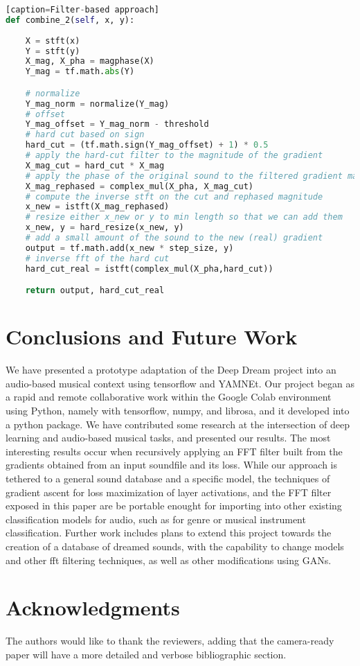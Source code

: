 \documentclass[a4paper,10pt,oneside]{article}
\begin{document}
\begin{sloppy}
\begin{lstlisting}[language=Python][caption=Filter-based approach]
def combine_2(self, x, y):
    
    X = stft(x)
    Y = stft(y)
    X_mag, X_pha = magphase(X)
    Y_mag = tf.math.abs(Y)

    # normalize
    Y_mag_norm = normalize(Y_mag)
    # offset
    Y_mag_offset = Y_mag_norm - threshold
    # hard cut based on sign
    hard_cut = (tf.math.sign(Y_mag_offset) + 1) * 0.5
    # apply the hard-cut filter to the magnitude of the gradient
    X_mag_cut = hard_cut * X_mag
    # apply the phase of the original sound to the filtered gradient mag
    X_mag_rephased = complex_mul(X_pha, X_mag_cut)
    # compute the inverse stft on the cut and rephased magnitude
    x_new = istft(X_mag_rephased)
    # resize either x_new or y to min length so that we can add them
    x_new, y = hard_resize(x_new, y)
    # add a small amount of the sound to the new (real) gradient 
    output = tf.math.add(x_new * step_size, y)
    # inverse fft of the hard cut
    hard_cut_real = istft(complex_mul(X_pha,hard_cut))

    return output, hard_cut_real
\end{lstlisting}


\section{Conclusions and Future Work}

 
We have presented a prototype adaptation of the Deep Dream project into an audio-based musical context using tensorflow and YAMNEt. Our project began as a rapid and remote collaborative work within the Google Colab environment using Python, namely with tensorflow, numpy, and librosa, and it developed into a python package. We have contributed some research at the intersection of deep learning and audio-based musical tasks, and presented our results. The most interesting results occur when recursively applying an FFT filter built from the gradients obtained from an input soundfile and its loss. While our approach is tethered to a general sound database and a specific model, the techniques of gradient ascent for loss maximization of layer activations, and the FFT filter exposed in this paper are be portable enought for importing into other existing classification models for audio, such as for genre or musical instrument classification. Further work includes plans to extend this project towards the creation of a database of dreamed sounds, with the capability to change models and other fft filtering techniques, as well as other modifications using GANs.

\section{Acknowledgments}
The authors would like to thank the reviewers, adding that the camera-ready paper will have a more detailed and verbose bibliographic section.




\end{sloppy}
\end{document}
